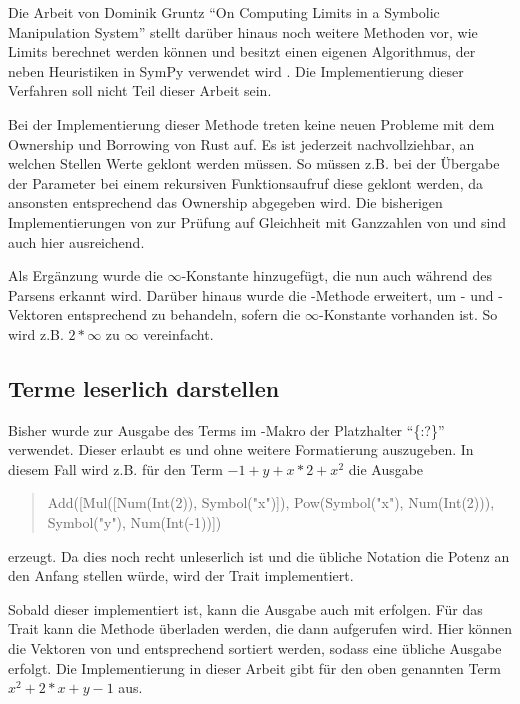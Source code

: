 \documentclass[11pt,a4paper, ngerman]{article}
\begin{document}
Die Arbeit von Dominik Gruntz ``On Computing Limits in a Symbolic Manipulation System'' \cite{GruntzPdf} stellt darüber hinaus noch weitere Methoden vor, wie Limits berechnet werden können und besitzt einen eigenen Algorithmus, der neben Heuristiken in SymPy verwendet wird \cite{SympyLimitNote}. Die Implementierung dieser Verfahren soll nicht Teil dieser Arbeit sein.

Bei der Implementierung dieser Methode treten keine neuen Probleme mit dem Ownership und Borrowing von Rust auf. Es ist jederzeit nachvollziehbar, an welchen Stellen Werte geklont werden müssen. So müssen z.B. bei der Übergabe der Parameter bei einem rekursiven Funktionsaufruf diese geklont werden, da ansonsten entsprechend das Ownership abgegeben wird. Die bisherigen Implementierungen von  zur Prüfung auf Gleichheit mit Ganzzahlen von  und  sind auch hier ausreichend.

Als Ergänzung wurde die $\infty$-Konstante hinzugefügt, die nun auch während des Parsens erkannt wird. Darüber hinaus wurde die -Methode erweitert, um - und -Vektoren entsprechend zu behandeln, sofern die $\infty$-Konstante vorhanden ist. So wird z.B. $2*\infty$ zu $\infty$ vereinfacht.

\subsection{Terme leserlich darstellen}
Bisher wurde zur Ausgabe des Terms im -Makro der Platzhalter ``\{:?\}'' verwendet. Dieser erlaubt es  und  ohne weitere Formatierung auszugeben. In diesem Fall wird z.B. für den Term $-1+y+x*2+x^2$ die Ausgabe
\begin{quote}
    Add([Mul([Num(Int(2)), Symbol("x")]), Pow(Symbol("x"), Num(Int(2))), Symbol("y"), Num(Int(-1))])
\end{quote}
erzeugt. Da dies noch recht unleserlich ist und die übliche Notation die Potenz an den Anfang stellen würde, wird der Trait  implementiert.

Sobald dieser implementiert ist, kann die Ausgabe auch mit  erfolgen. Für das Trait kann die Methode  überladen werden, die dann aufgerufen wird. Hier können die Vektoren von  und  entsprechend sortiert werden, sodass eine übliche Ausgabe erfolgt. Die Implementierung in dieser Arbeit gibt für den oben genannten Term $x^2+2*x+y-1$ aus.
\end{document}
